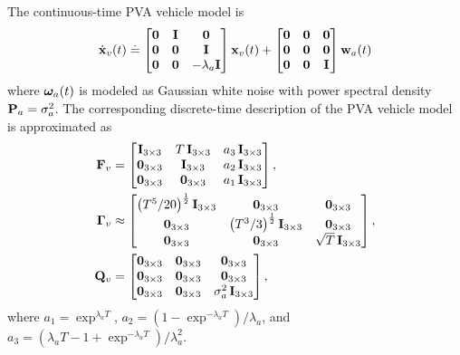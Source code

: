 The continuous-time PVA vehicle model is
\begin{align}
	\dot{\mathbf{x}}_v(t) \doteq 
	\begin{bmatrix}
		\boldsymbol{0} & \mathbf{I} & \boldsymbol{0} \\ \boldsymbol{0} & \boldsymbol{0} & \mathbf{I} \\ \boldsymbol{0} & \boldsymbol{0} & -\lambda_a \mathbf{I}
	\end{bmatrix} 
	\mathbf{x}_v(t) +
	\begin{bmatrix} \boldsymbol{0} & \boldsymbol{0} & \boldsymbol{0} \\ \boldsymbol{0} & \boldsymbol{0} & \boldsymbol{0} \\ \boldsymbol{0} & \boldsymbol{0} & \mathbf{I} \end{bmatrix} \mathbf{w}_a(t)
\end{align}
where $\boldsymbol{\omega}_a(t)$ is modeled as Gaussian white noise with power spectral density $\mathbf{P}_a = \sigma^2_a$. 
The corresponding discrete-time description of the PVA vehicle model is approximated as
\begin{align}
	\mathbf{F}_v &= 
	\begin{bmatrix}
		\mathbf{I}_{3 \times 3} & T\,\mathbf{I}_{3 \times 3} & a_3 \, \mathbf{I}_{3 \times 3} \\
		\boldsymbol{0}_{3 \times 3} & \mathbf{I}_{3 \times 3} & a_2 \, \mathbf{I}_{3 \times 3} \\
		\boldsymbol{0}_{3 \times 3} & \boldsymbol{0}_{3 \times 3} & a_1 \, \mathbf{I}_{3 \times 3}
	\end{bmatrix}, ~ \\
	\boldsymbol{\Gamma}_v &\approx
	\begin{bmatrix}
		\big(T^5/20 \big)^{\frac{1}{2}} \, \mathbf{I}_{3 \times 3} & \boldsymbol{0}_{3 \times 3} & \boldsymbol{0}_{3 \times 3}\\
		\boldsymbol{0}_{3 \times 3} & \big(T^3 / 3\big)^{\frac{1}{2}} \, \mathbf{I}_{3 \times 3} & \boldsymbol{0}_{3 \times 3} \\
		\boldsymbol{0}_{3 \times 3} & \boldsymbol{0}_{3 \times 3} & \sqrt{T} \, \mathbf{I}_{3 \times 3}
	\end{bmatrix}, \\ 
	\mathbf{Q}_{v} &= 
	\begin{bmatrix} \boldsymbol{0}_{3 \times 3} & \boldsymbol{0}_{3 \times 3} & \boldsymbol{0}_{3 \times 3} \\ 
					\boldsymbol{0}_{3 \times 3} & \boldsymbol{0}_{3 \times 3} & \boldsymbol{0}_{3 \times 3} \\
		 			\boldsymbol{0}_{3 \times 3} & \boldsymbol{0}_{3 \times 3} & \sigma^2_a \, \mathbf{I}_{3 \times 3} 
	\end{bmatrix},
\end{align}
where $a_1 = \exp^{\lambda_a T}$, $a_2 = (1 - \exp^{-\lambda_a T})/ \lambda_a$, and $a_3 = (\lambda_a T - 1 + \exp^{-\lambda_a T})/ \lambda_a^2$.

